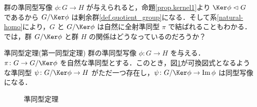 \documentclass[geometry_main]{subfiles}
\begin{document}
群の準同型写像 $\phi \colon G \to H$ が与えられると，命題\ref{prop.kernel1}より $\Ker \phi \vartriangleleft G$ であるから $G/\Ker \phi$ は剰余群\ref{def.quotient_group}になる．そして系\ref{natural-homo}により，$G$ と $G /\Ker \phi$ は自然に全射準同型 $\pi$ で結ばれることもわかる．
では，群 $G/\Ker \phi$ と群 $H$ の関係はどうなっているのだろうか？

\begin{mytheo}[label=thm.homo1]{準同型定理(第一同型定理)}
	群の準同型写像 $\phi \colon G \to H$ を与える．$\pi \colon G \to G/\Ker \phi$ を自然な準同型とする．このとき，図\ref{fig.homo1}が可換図式となるような準同型 $\psi \colon G/\Ker \phi \to H$ がただ一つ存在し，$\psi \colon G/\Ker \phi \to \Im \phi$ は同型写像になる．
\end{mytheo}

\begin{figure}[H]
	\centering
	\caption{準同型定理}
	\label{fig.homo1}
\end{figure}%
\end{document}
